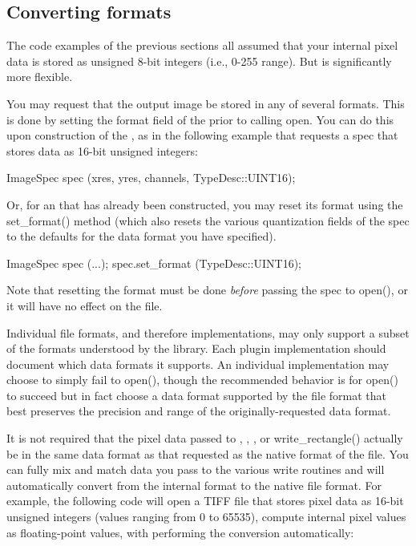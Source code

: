 \subsection{Converting formats}
\label{sec:imageoutput:convertingformats}

The code examples of the previous sections all assumed that your
internal pixel data is stored as unsigned 8-bit integers (i.e., 0-255
range).  But \product is significantly more flexible.  

You may request that the output image be stored in any of several
formats.  This is done by setting the {\kw format} field of the
\ImageSpec prior to calling {\kw open}.  You can do this upon
construction of the \ImageSpec, as in the following example
that requests a spec that stores data as 16-bit unsigned integers:
\begin{code}
        ImageSpec spec (xres, yres, channels, TypeDesc::UINT16);
\end{code}

\noindent Or, for an \ImageSpec that has already been
constructed, you may reset its format using the {\kw set_format()}
method (which also resets the various quantization fields of the
spec to the defaults for the data format you have specified).  

\begin{code}
        ImageSpec spec (...);
        spec.set_format (TypeDesc::UINT16);
\end{code}

Note that resetting the format must be done \emph{before} passing the
spec to {\kw open()}, or it will have no effect on the file.

Individual file formats, and therefore \ImageOutput implementations, may
only support a subset of the formats understood by the \product library.
Each \ImageOutput plugin implementation should document which data
formats it supports.  An individual \ImageOutput implementation may
choose to simply fail to {\kw open()}, though the recommended behavior
is for {\kw open()} to succeed but in fact choose a data format
supported by the file format that best preserves the precision and range
of the originally-requested data format.

It is not required that the pixel data passed to \writeimage,
\writescanline, \writetile, or {\kw write_rectangle()} actually be in
the same data format as that requested as the native format of the file.
You can fully mix and match data you pass to the various {\kw write}
routines and \product will automatically convert from the internal
format to the native file format.  For example, the following code will
open a TIFF file that stores pixel data as 16-bit unsigned integers
(values ranging from 0 to 65535), compute internal pixel values as
floating-point values, with \writeimage performing the conversion
automatically:

